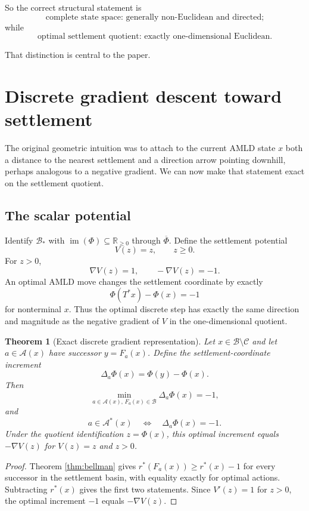 \documentclass[11pt,letterpaper]{article}
\newtheorem{theorem}{Theorem}[section]
\theoremstyle{remark}
\newcommand{\Cset}{\mathcal C}
\newcommand{\Basin}{\mathcal B}
\newcommand{\A}{\mathcal A}
\newcommand{\R}{\mathbb R}
\newcommand{\rstar}{r^{\!*}}
\newcommand{\im}{\operatorname{im}}
\begin{document}
So the correct structural statement is
\[
\boxed{\text{complete state space: generally non-Euclidean and directed;}}
\]
while
\[
\boxed{\text{optimal settlement quotient: exactly one-dimensional Euclidean.}}
\]

That distinction is central to the paper.

\section{Discrete gradient descent toward settlement}\label{sec:gradient}

The original geometric intuition was to attach to the current AMLD state $x$ both a distance to the nearest settlement and a direction arrow pointing downhill, perhaps analogous to a negative gradient. We can now make that statement exact on the settlement quotient.

\subsection{The scalar potential}

Identify $\Basin_{\!*}$ with $\im(\Phi)\subseteq\R_{\ge0}$ through $\overline\Phi$. Define the settlement potential
\[
V(z)=z,
\qquad z\ge0.
\]
For $z>0$,
\[
\nabla V(z)=1,
\qquad -\nabla V(z)=-1.
\]
An optimal AMLD move changes the settlement coordinate by exactly
\[
\Phi(T^*x)-\Phi(x)=-1
\]
for nonterminal $x$. Thus the optimal discrete step has exactly the same direction and magnitude as the negative gradient of $V$ in the one-dimensional quotient.

\begin{theorem}[Exact discrete gradient representation]\label{thm:gradient}
Let $x\in\Basin\setminus\Cset$ and let $a\in\A(x)$ have successor $y=F_a(x)$. Define the settlement-coordinate increment
\[
\Delta_a\Phi(x)=\Phi(y)-\Phi(x).
\]
Then
\[
\min_{a\in\A(x),\,F_a(x)\in\Basin}\Delta_a\Phi(x)=-1,
\]
and
\[
a\in\A^*(x)\quad\Longleftrightarrow\quad \Delta_a\Phi(x)=-1.
\]
Under the quotient identification $z=\Phi(x)$, this optimal increment equals $-\nabla V(z)$ for $V(z)=z$ and $z>0$.
\end{theorem}

\begin{proof}
Theorem \ref{thm:bellman} gives $\rstar(F_a(x))\ge\rstar(x)-1$ for every successor in the settlement basin, with equality exactly for optimal actions. Subtracting $\rstar(x)$ gives the first two statements. Since $V'(z)=1$ for $z>0$, the optimal increment $-1$ equals $-\nabla V(z)$.
\end{proof}
\end{document}
